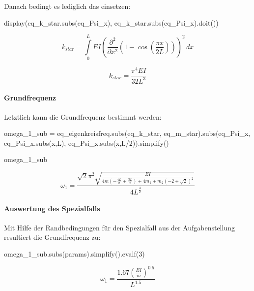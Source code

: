 \documentclass[
  letterpaper,
  DIV=11,
  numbers=noendperiod]{scrartcl}
\let\oldparagraph\paragraph
\renewcommand{\paragraph}[1]{\oldparagraph{#1}\mbox{}}
\newenvironment{Shaded}{\begin{snugshade}}{\end{snugshade}}
\newcommand{\DecValTok}[1]{\textcolor[rgb]{0.68,0.00,0.00}{#1}}
\newcommand{\NormalTok}[1]{\textcolor[rgb]{0.00,0.23,0.31}{#1}}
\newcommand{\OperatorTok}[1]{\textcolor[rgb]{0.37,0.37,0.37}{#1}}
\begin{document}
Danach bedingt es lediglich das einsetzen:

\begin{Shaded}
\begin{Highlighting}[]
\NormalTok{display(eq\_k\_star.subs(eq\_Psi\_x),}
\NormalTok{       eq\_k\_star.subs(eq\_Psi\_x).doit())}
\end{Highlighting}
\end{Shaded}

\begin{equation}k_{star} = \int\limits_{0}^{L} E I \left(\frac{\partial^{2}}{\partial x^{2}} \left(1 - \cos{\left(\frac{\pi x}{2 L} \right)}\right)\right)^{2}\, dx\end{equation}

\begin{equation}k_{star} = \frac{\pi^{4} E I}{32 L^{3}}\end{equation}

\hypertarget{grundfrequenz}{%
\paragraph{Grundfrequenz}\label{grundfrequenz}}

Letztlich kann die Grundfrequenz bestimmt werden:

\begin{Shaded}
\begin{Highlighting}[]
\NormalTok{omega\_1\_sub }\OperatorTok{=}\NormalTok{ eq\_eigenkreisfreq.subs(eq\_k\_star, eq\_m\_star).subs(eq\_Psi\_x, eq\_Psi\_x.subs(x,L), eq\_Psi\_x.subs(x,L}\OperatorTok{/}\DecValTok{2}\NormalTok{)).simplify()}

\NormalTok{omega\_1\_sub}
\end{Highlighting}
\end{Shaded}

\begin{equation}\omega_{1} = \frac{\sqrt{2} \pi^{2} \sqrt{\frac{E I}{4 m \left(- \frac{4 L}{\pi} + \frac{3 L}{2}\right) + 4 m_{1} + m_{2} \left(-2 + \sqrt{2}\right)^{2}}}}{4 L^{\frac{3}{2}}}\end{equation}

\hypertarget{auswertung-des-spezialfalls}{%
\paragraph{Auswertung des
Spezialfalls}\label{auswertung-des-spezialfalls}}

Mit Hilfe der Randbedingungen für den Spezialfall aus der
Aufgabenstellung resultiert die Grundfrequenz zu:

\begin{Shaded}
\begin{Highlighting}[]
\NormalTok{omega\_1\_sub.subs(params).simplify().evalf(}\DecValTok{3}\NormalTok{)}
\end{Highlighting}
\end{Shaded}

\begin{equation}\omega_{1} = \frac{1.67 \left(\frac{E I}{m}\right)^{0.5}}{L^{1.5}}\end{equation}
\end{document}
